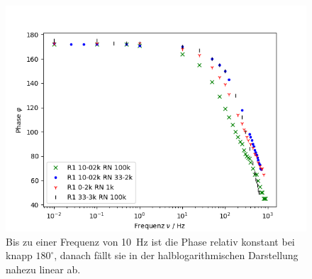 \begin{figure}[h]
	\centering
	\includegraphics[width=\textwidth]{img/j.png}
	\caption{Bis zu einer Frequenz von \SI{10}{\hertz} ist die Phase relativ konstant bei knapp $180^\circ$, danach fällt sie in der halblogarithmischen Darstellung nahezu linear ab.}
	\label{Phasenbeziehung}
\end{figure}

\FloatBarrier
